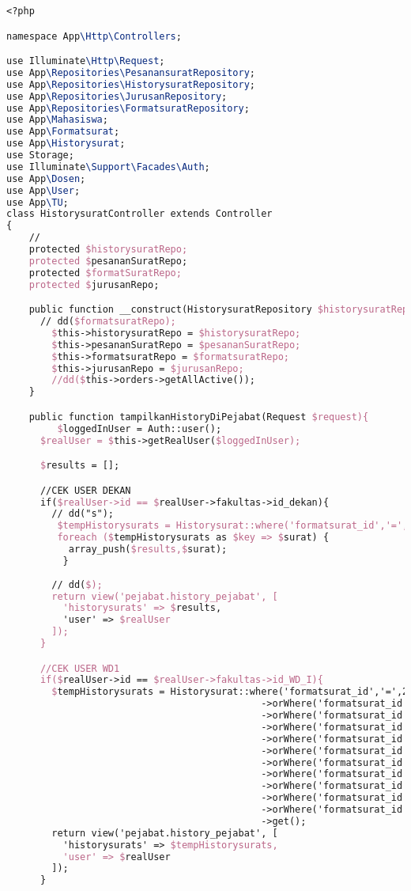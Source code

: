 \begin{lstlisting}[language=tex,basicstyle=\tiny,caption=HistorysuratController.php]
<?php

namespace App\Http\Controllers;

use Illuminate\Http\Request;
use App\Repositories\PesanansuratRepository;
use App\Repositories\HistorysuratRepository;
use App\Repositories\JurusanRepository;
use App\Repositories\FormatsuratRepository;
use App\Mahasiswa;
use App\Formatsurat;
use App\Historysurat;
use Storage;
use Illuminate\Support\Facades\Auth;
use App\Dosen;
use App\User;
use App\TU;
class HistorysuratController extends Controller
{
    //
    protected $historysuratRepo;
    protected $pesananSuratRepo;
    protected $formatSuratRepo;
    protected $jurusanRepo;

    public function __construct(HistorysuratRepository $historysuratRepo, PesanansuratRepository $pesananSuratRepo, FormatsuratRepository $formatsuratRepo, JurusanRepository $jurusanRepo){
      // dd($formatsuratRepo);
        $this->historysuratRepo = $historysuratRepo;
        $this->pesananSuratRepo = $pesananSuratRepo;
        $this->formatsuratRepo = $formatsuratRepo;
        $this->jurusanRepo = $jurusanRepo;
        //dd($this->orders->getAllActive());
    } 

    public function tampilkanHistoryDiPejabat(Request $request){
         $loggedInUser = Auth::user();
      $realUser = $this->getRealUser($loggedInUser);

      $results = [];

      //CEK USER DEKAN
      if($realUser->id == $realUser->fakultas->id_dekan){
        // dd("s");
         $tempHistorysurats = Historysurat::where('formatsurat_id','=',9)->orWhere('formatsurat_id','=',10)->get();
         foreach ($tempHistorysurats as $key => $surat) {
           array_push($results,$surat);
          }
        
        // dd($);
        return view('pejabat.history_pejabat', [
          'historysurats' => $results,
          'user' => $realUser
        ]);
      }

      //CEK USER WD1
      if($realUser->id == $realUser->fakultas->id_WD_I){
        $tempHistorysurats = Historysurat::where('formatsurat_id','=',2)
                                             ->orWhere('formatsurat_id','=',11)
                                             ->orWhere('formatsurat_id','=',12)
                                             ->orWhere('formatsurat_id','=',13)
                                             ->orWhere('formatsurat_id','=',14)
                                             ->orWhere('formatsurat_id','=',15)
                                             ->orWhere('formatsurat_id','=',16)
                                             ->orWhere('formatsurat_id','=',17)
                                             ->orWhere('formatsurat_id','=',18)
                                             ->orWhere('formatsurat_id','=',19)
                                             ->orWhere('formatsurat_id','=',20)
                                             ->get();
        return view('pejabat.history_pejabat', [
          'historysurats' => $tempHistorysurats,
          'user' => $realUser
        ]);
      }


\end{lstlisting}
